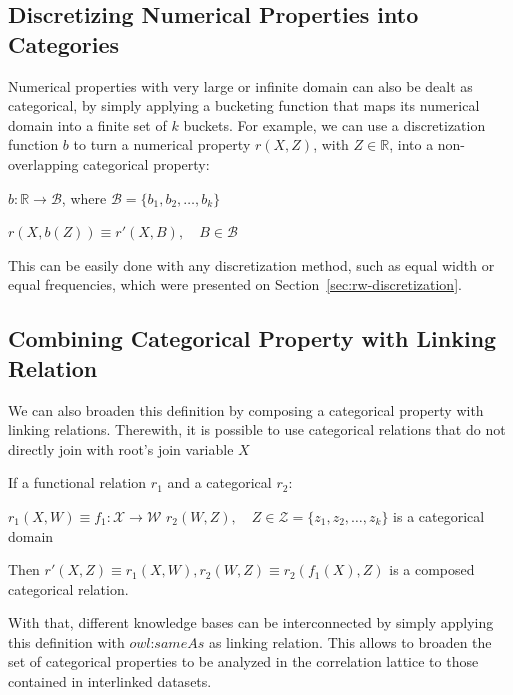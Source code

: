 \subsection{Discretizing Numerical Properties into Categories}

Numerical properties with very large or infinite domain can also be dealt as categorical, by simply applying a
bucketing
function that maps its numerical domain into a finite set of $k$ buckets. For example, we can use a discretization
function $b$ to turn a numerical property $r(X,Z)$, with $Z \in \mathbb{R}$, into a non-overlapping categorical
property:

\begin{center}
 $b: \mathbb{R} \rightarrow \mathcal{B}$, where $\mathcal{B}=\{b_1,b_2,\dots ,b_k \}$
\end{center}

\begin{center}
 $r(X,b(Z)) \equiv r'(X,B) , \quad B \in \mathcal{B}$
\end{center}

This can be easily done with any discretization method, such as equal width or equal frequencies, which were
presented on Section~\ref{sec:rw-discretization}.

\subsection{Combining Categorical Property with Linking Relation}
We can also broaden this definition by composing a categorical property with linking relations. Therewith, it is
possible to use categorical relations that do not directly join with root's join variable $X$

If a functional relation $r_1$ and a categorical $r_2$:

$r_1(X,W) \equiv f_1 : \mathcal{X} \rightarrow \mathcal{W}$ \newline
$r_2(W,Z),\quad Z \in \mathcal{Z}=\{z_1,z_2,\ldots,z_k\}$ is a categorical domain 

Then $r'(X,Z) \equiv r_1(X,W),r_2(W,Z) \equiv r_2(f_1(X),Z)$ is a composed categorical relation. 

With that, different knowledge bases can be interconnected by simply applying this definition with $owl$:$sameAs$
as linking relation. This allows to broaden the set of categorical properties to be analyzed in the correlation
lattice
to those contained in interlinked datasets.

